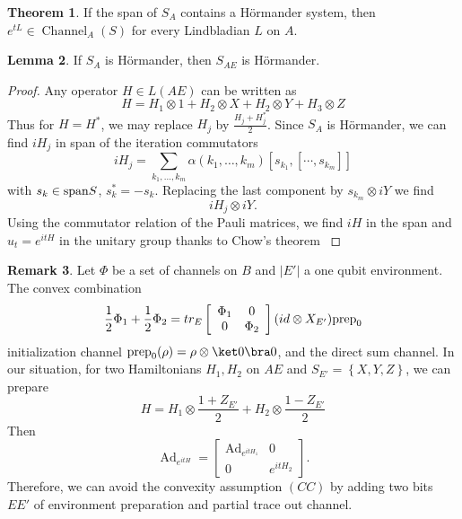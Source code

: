 \documentclass[11pt,reqno]{amsart}
\makeatletter
\theoremstyle{definition}
\newtheorem{theorem}{Theorem}[section]
\newtheorem{lemma}[theorem]{Lemma}
\newtheorem{remark}[theorem]{Remark}
\newcommand{\lset}{\left\{ }
\newcommand{\rset}{\right\} }
\DeclarePairedDelimiter\norm{\lVert}{\rVert}%
\let\oldnorm\norm
\def\norm{\@ifstar{\oldnorm}{\oldnorm*}}
\newcommand{\kla}{\left[}
\newcommand{\mer}{\right]}
\DeclareMathOperator{\Ad}{Ad}
\DeclareMathOperator{\chan}{Channel}
\makeatother
\begin{document}
 
 \begin{theorem}\label{htrans}
    If the span of $S_A$ contains a H\"ormander system, then $e^{tL}\in \chan_A(S)$ for every Lindbladian $L$ on $A$. 
 \end{theorem}  
 

\begin{lemma}
    If $S_A$ is H\"ormander, then $S_{AE}$ is H\"ormander.
\end{lemma} 

\begin{proof}
    Any operator $H\in L(AE)$ can be written as
    \[ H = H_1\otimes 1+ H_2\otimes X+H_2\otimes Y+H_3\otimes Z  \]
    Thus for $H=H^*$, we may replace $H_j$ by $\frac{H_j+H_j^*}{2}$. Since $S_A$ is H\"ormander, we can find $iH_j$ in span of the iteration commutators 
    \[ iH_j = \sum_{k_1,\dots ,k_m} \alpha(k_1,\dots ,k_m) [s_{k_1},[\cdots ,s_{k_m}]] \] 
    with $s_k\in {\rm span} S$, $s_k^*=-s_k$. Replacing the last component by $s_{k_m}\otimes iY$ we find 
    \[ iH_j \otimes iY  .\] 
    Using the commutator relation of the Pauli matrices, we find $iH$ in the span and $u_t=e^{itH}$ in the unitary group thanks to Chow's theorem \cite{chow}
\end{proof}
\begin{remark}
    Let $\Phi$ be a set of channels on $B$ and $|E'|$ a one qubit environment.  The convex combination 
    \[ \frac{1}{2}\Phi_1+\frac{1}{2}\Phi_2 = tr_E \kla \begin{array}{cc} \Phi_1&0 \\
    0&\Phi_2 \end{array}\mer (id\otimes X_{E'}) {\rm prep}_{0}  \] 
    initialization channel ${\rm prep}_0(\rho)=\rho\otimes \ket 0\bra 0$, and the direct sum channel. In our situation, for two  Hamiltonians $H_1,H_2$ on $AE$ and $S_{E'}=\lset X,Y,Z\rset $, we can prepare
    \[ H = H_1\otimes \frac{1+Z_{E'}}{2} + H_2 \otimes \frac{1-Z_{E'}}{2} \] 
    Then 
    \[ \Ad_{e^{itH}} =   \kla \begin{array}{cc} \Ad_{e^{itH_1}}&0 \\
    0&e^{itH_2}\end{array}\mer  .\] 
    Therefore, we can avoid the convexity assumption $(CC)$ by adding two bits $EE'$ of environment preparation and partial trace out channel.  
\end{remark}  

\end{document}

